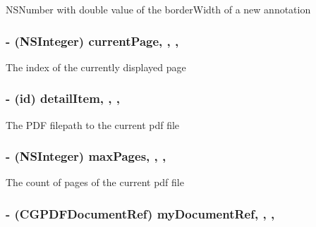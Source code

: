 N\-S\-Number with double value of the border\-Width of a new annotation \hypertarget{interface_a_p_d_f_detail_view_controller_af025d28bbcd266b1a1837d6ad486532c}{
\subsubsection[{current\-Page}]{\setlength{\rightskip}{0pt plus 5cm}-\/ (N\-S\-Integer) current\-Page\hspace{0.3cm}{\ttfamily [read]}, {\ttfamily [write]}, {\ttfamily [nonatomic]}, {\ttfamily [assign]}}}\label{interface_a_p_d_f_detail_view_controller_af025d28bbcd266b1a1837d6ad486532c}
The index of the currently displayed page \hypertarget{interface_a_p_d_f_detail_view_controller_af25271202cf1177a41928066d6cd849a}{
\subsubsection[{detail\-Item}]{\setlength{\rightskip}{0pt plus 5cm}-\/ (id) detail\-Item\hspace{0.3cm}{\ttfamily [read]}, {\ttfamily [write]}, {\ttfamily [nonatomic]}, {\ttfamily [strong]}}}\label{interface_a_p_d_f_detail_view_controller_af25271202cf1177a41928066d6cd849a}
The P\-D\-F filepath to the current pdf file \hypertarget{interface_a_p_d_f_detail_view_controller_a2da3cbd8452ab98417155110f0a18294}{
\subsubsection[{max\-Pages}]{\setlength{\rightskip}{0pt plus 5cm}-\/ (N\-S\-Integer) max\-Pages\hspace{0.3cm}{\ttfamily [read]}, {\ttfamily [write]}, {\ttfamily [nonatomic]}, {\ttfamily [assign]}}}\label{interface_a_p_d_f_detail_view_controller_a2da3cbd8452ab98417155110f0a18294}
The count of pages of the current pdf file \hypertarget{interface_a_p_d_f_detail_view_controller_a46c3fb7500d16940beb2097e6674af7a}{
\subsubsection[{my\-Document\-Ref}]{\setlength{\rightskip}{0pt plus 5cm}-\/ (C\-G\-P\-D\-F\-Document\-Ref) my\-Document\-Ref\hspace{0.3cm}{\ttfamily [read]}, {\ttfamily [write]}, {\ttfamily [nonatomic]}, {\ttfamily [assign]}}}\label{interface_a_p_d_f_detail_view_controller_a46c3fb7500d16940beb2097e6674af7a}
